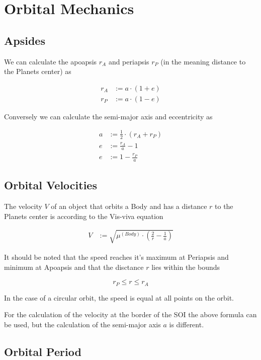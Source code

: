 \documentclass[11pt]{report}
\begin{document}
\section{Orbital Mechanics}

\subsection{Apsides}

We can calculate the  apoapsis $r_A$ and
 periapsis $r_P$ (in the meaning distance to the
Planets center) as

\begin{align}
r_A & := a \cdot (1 + e)\\
r_P & := a \cdot (1 - e)
\end{align}

Conversely we can calculate the semi-major axis and eccentricity as

\begin{align}
  a & := \frac{1}{2}\cdot(r_A + r_P)\\
  e & := \frac{r_A}{a} - 1\\
  e & := 1 - \frac{r_P}{a}
\end{align}

\subsection{Orbital Velocities} \label{OrbitalVelocities}

The velocity $V$ of an object that orbits a Body and has a distance
$r$ to the Planets center is according to the Vis-viva equation
\cite{VisViva}

\begin{align}
V & := \sqrt{\mu^{(Body)} \cdot \left(\frac{2}{r} - \frac{1}{a}\right)}
\end{align}

It should be noted that the speed reaches it's maximum at Periapsis
and minimum at Apoapsis and that the disctance $r$ lies within the
bounds

$$
r_P \leq r \leq r_A
$$

In the case of a circular orbit, the speed is equal at all points on
the orbit.

For the calculation of the velocity at the border of the SOI the above
formula can be used, but the calculation of the semi-major axis $a$ is
different.


\subsection{Orbital Period}
\end{document}
